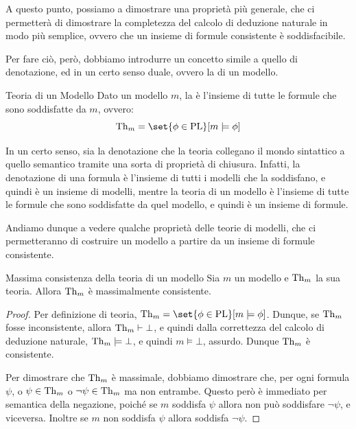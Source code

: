 A questo punto, possiamo a dimostrare una proprietà più generale, che ci permetterà di dimostrare la completezza del calcolo di deduzione naturale in modo più semplice, ovvero che un insieme di formule consistente è soddisfacibile.

Per fare ciò, però, dobbiamo introdurre un concetto simile a quello di denotazione, ed in un certo senso duale, ovvero la  di un modello.

\begin{definition}{Teoria di un Modello}
  Dato un modello \(m\), la  è l'insieme di tutte le formule che sono soddisfatte da \(m\), ovvero:
  \[\Th{m} = \set{\phi \in \PL }[ m \models \phi]\]
\end{definition}

In un certo senso, sia la denotazione che la teoria collegano il mondo sintattico a quello semantico tramite una sorta di proprietà di chiusura. Infatti, la denotazione di una formula è l'insieme di tutti i modelli che la soddisfano, e quindi è un insieme di modelli, mentre la teoria di un modello è l'insieme di tutte le formule che sono soddisfatte da quel modello, e quindi è un insieme di formule.

Andiamo dunque a vedere qualche proprietà delle teorie di modelli, che ci permetteranno di costruire un modello a partire da un insieme di formule consistente.

\begin{proposition}{Massima consistenza della teoria di un modello}
  Sia \(m\) un modello e \(\operatorname{Th}_{m}\) la sua teoria. Allora \(\operatorname{Th}_{m}\) è massimalmente consistente.
\end{proposition}

\begin{proof}
  Per definizione di teoria, \(\Th{m} = \set{\phi\in\PL}[m\models\phi]\). Dunque, se \(\operatorname{Th}_{m}\) fosse inconsistente, allora \(\operatorname{Th}_{m}\vdash\bot\), e quindi dalla correttezza del calcolo di deduzione naturale, \(\operatorname{Th}_{m}\models\bot\), e quindi \(m\models\bot\), assurdo. Dunque \(\operatorname{Th}_{m}\) è consistente.

  Per dimostrare che \(\operatorname{Th}_{m}\) è massimale, dobbiamo dimostrare che, per ogni formula \(\psi\), o \(\psi\in\operatorname{Th}_{m}\) o \(\neg\psi\in\operatorname{Th}_{m}\) ma non entrambe. Questo però è immediato per semantica della negazione, poiché se \(m\) soddisfa \(\psi\) allora non può soddisfare \(\neg\psi\), e viceversa. Inoltre se \(m\) non soddisfa \(\psi\) allora soddisfa \(\neg\psi\).
\end{proof}

